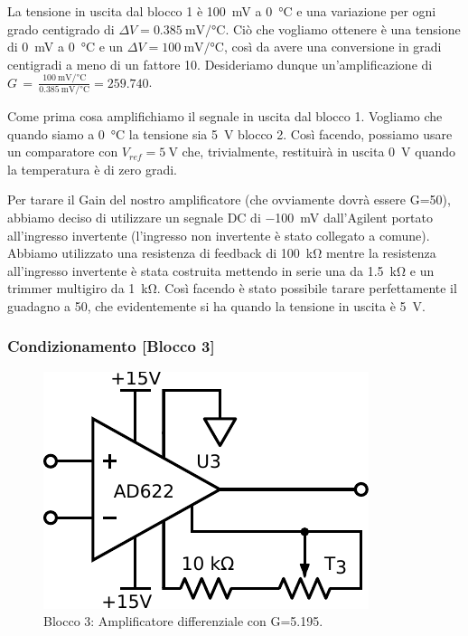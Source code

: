 La tensione in uscita dal blocco 1 è \SI{100}{\milli\volt} a \SI{0}{\celsius} e una variazione per ogni grado centigrado di $\Delta V=\SI{0.385}{\milli\volt}/\si{\celsius}$.
Ciò che vogliamo ottenere è una tensione di \SI{0}{\milli\volt} a \SI{0}{\celsius} e un $\Delta V=\SI{100}{\milli\volt}/\si{\celsius}$, così da avere una conversione in gradi centigradi a meno di un fattore 10. 
Desideriamo dunque un'amplificazione di $G\,=\,\frac{\SI{100}{\milli\volt}/\si{\celsius}}{\SI{0.385}{\milli\volt}/\si{\celsius}}=\num{259.740}$. 

Come prima cosa amplifichiamo il segnale in uscita dal blocco 1.
Vogliamo che quando siamo a \SI{0}{\celsius} la tensione sia \SI{5}{\volt} blocco 2.
Così facendo, possiamo usare un comparatore con $V_{ref}=\SI{5}{\volt}$ che, trivialmente, restituirà in uscita \SI{0}{\volt} quando la temperatura è di zero gradi. 

Per tarare il Gain del nostro amplificatore (che ovviamente dovrà essere G=50), abbiamo deciso di utilizzare un segnale DC di \SI{-100}{\mV} dall'Agilent portato all'ingresso invertente (l'ingresso non invertente è stato collegato a comune).
Abbiamo utilizzato una resistenza di feedback di \SI{100}{\kilo\ohm} mentre la resistenza all'ingresso invertente è stata costruita mettendo in serie una da \SI{1.5}{\kilo\ohm} e un trimmer multigiro da \SI{1}{\kilo\ohm}.
Così facendo è stato possibile tarare perfettamente il guadagno a 50, che evidentemente si ha quando la tensione in uscita è \SI{5}{\volt}. 

\subsubsection{Condizionamento [Blocco 3]}

\begin{figure}
\centering
\includegraphics[width=.25\textwidth]{../E06/latex/P3.pdf}
\caption{Blocco 3: Amplificatore differenziale con G=5.195.}
\label{cir5:2wire}
\end{figure}

